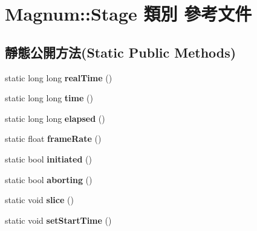 \hypertarget{class_magnum_1_1_stage}{}\section{Magnum\+:\+:Stage 類別 參考文件}
\label{class_magnum_1_1_stage}
\subsection*{靜態公開方法(Static Public Methods)}
\begin{DoxyCompactItemize}
\item 
static long long {\bfseries real\+Time} ()\hypertarget{class_magnum_1_1_stage_ae2365d2f079becc5d073273fa2508a4d}{}\label{class_magnum_1_1_stage_ae2365d2f079becc5d073273fa2508a4d}

\item 
static long long {\bfseries time} ()\hypertarget{class_magnum_1_1_stage_a7dffdf5f8d64190b9c01f04ee3ad3eea}{}\label{class_magnum_1_1_stage_a7dffdf5f8d64190b9c01f04ee3ad3eea}

\item 
static long long {\bfseries elapsed} ()\hypertarget{class_magnum_1_1_stage_a8719948537b826df6723dd0c7d88d69e}{}\label{class_magnum_1_1_stage_a8719948537b826df6723dd0c7d88d69e}

\item 
static float {\bfseries frame\+Rate} ()\hypertarget{class_magnum_1_1_stage_a3488e501f10aa2444ab5c46a5e6515dc}{}\label{class_magnum_1_1_stage_a3488e501f10aa2444ab5c46a5e6515dc}

\item 
static bool {\bfseries initiated} ()\hypertarget{class_magnum_1_1_stage_acdc7714ac655d96cbe66a9cbc95359a3}{}\label{class_magnum_1_1_stage_acdc7714ac655d96cbe66a9cbc95359a3}

\item 
static bool {\bfseries aborting} ()\hypertarget{class_magnum_1_1_stage_a2f52c44dea2849d8c6ec7a437ea349f8}{}\label{class_magnum_1_1_stage_a2f52c44dea2849d8c6ec7a437ea349f8}

\item 
static void {\bfseries slice} ()\hypertarget{class_magnum_1_1_stage_abcc5ad71ad69db5516171b10239d4ad6}{}\label{class_magnum_1_1_stage_abcc5ad71ad69db5516171b10239d4ad6}

\item 
static void {\bfseries set\+Start\+Time} ()\hypertarget{class_magnum_1_1_stage_ac58974b8773c5ceb0ba3ccf5996af0ac}{}\label{class_magnum_1_1_stage_ac58974b8773c5ceb0ba3ccf5996af0ac}


\end{DoxyCompactItemize}
